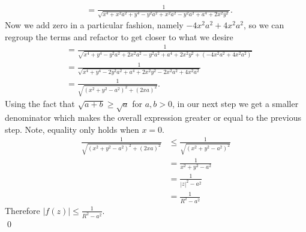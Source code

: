 \documentclass[10pt]{amsart}
\theoremstyle{nonumberplain}
\begin{document}
\begin{enumerate}[label={\bf {\arabic*}:}]
\begin{align*}
{{		}
	} \\
	&= \frac{1}{
		\sqrt{
			x^4 + x^2a^2 + y^4 - y^2a^2 + x^2a^2 - y^2a^2 + a^4 + 2x^2y^2
		}
	}.
\end{align*}
Now we add zero in a particular fashion, namely $- 4x^2a^2 + 4x^2a^2 $, so we can regroup the terms and refactor to get closer to what we desire
\begin{align*}
	&= \frac{1}{
		\sqrt{
			x^4 + y^4 - y^2a^2 + 2x^2a^2 - y^2a^2 + a^4 + 2x^2y^2 +\left( - 4x^2a^2 + 4x^2a^2 \right)
		}
	} \\
	&= \frac{1}{
		\sqrt{
			x^4 + y^4 - 2y^2a^2 + a^4 + 2x^2y^2 - 2x^2a^2 + 4x^2a^2
		}
	} \\
	&= \frac{1}{\sqrt{\left(x^2 + y^2 - a^2\right)^2 + \left(2xa\right)^2}}.
\end{align*}
Using the fact that $\sqrt{a + b} \geq \sqrt{a}$ for $a, b > 0$, in our next step we get a smaller denominator which makes the overall expression greater or equal to the previous step. Note, equality only holds when $x=0$.
\begin{align*}
 \frac{1}{\sqrt{\left(x^2 + y^2 - a^2\right)^2 + \left(2xa\right)^2}}
 	&\leq \frac{1}{\sqrt{\left(x^2 + y^2 - a^2\right)^2}} \\
	&= \frac{1}{x^2 + y^2 - a^2} \\
	&= \frac{1}{|z|^2 - a^2} \\
	&= \frac{1}{R^2 - a^2}
\end{align*}
Therefore $\left| f(z) \right| \leq \frac{1}{R^2 - a^2}$. \\
\qed


\end{enumerate}
\end{document}
